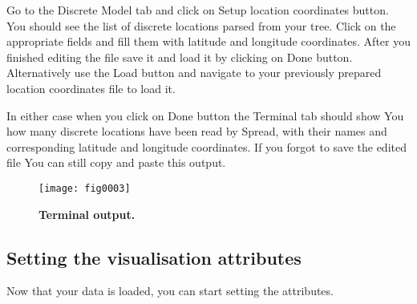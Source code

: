 Go to the Discrete Model tab and click on Setup location coordinates
button. You should see the list of discrete locations parsed from
your tree. Click on the appropriate fields and fill them with latitude
and longitude coordinates. After you finished editing the file save
it and load it by clicking on Done button. Alternatively use the Load
button and navigate to your previously prepared location coordinates
file to load it. 

In either case when you click on Done button the Terminal tab should
show You how many discrete locations have been read by Spread, with
their names and corresponding latitude and longitude coordinates.
If you forgot to save the edited file You can still copy and paste
this output.

\begin{figure}[h!]
\begin{centering}
\texttt{[image: fig0003]}
\caption{
{ \footnotesize 
{\bf Terminal output.}
} %
}
\label{fig:0003}
\par\end{centering}
\end{figure}

\subsection{Setting the visualisation attributes}

Now that your data is loaded, you can start setting the attributes.

